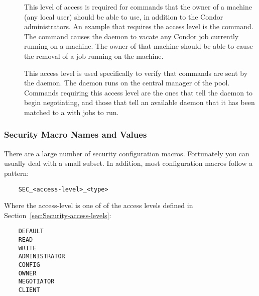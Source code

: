 \begin{description}

\item[] \label{sec-level-owner} This level of access is
   required for commands that the owner of a machine (any local user)
   should be able to use, in addition to the Condor administrators.
   An example that requires the  access level is
   the  command.
   The command causes the  daemon to vacate any
   Condor job currently running on a machine.
   The owner of that machine should be able to cause the removal
   of a job running on the machine.

\item[] \label{sec-level-negotiator} This 
   access level is used specifically to verify that commands are
   sent by the  daemon.
   The  daemon runs on the central manager of
   the pool.
   Commands requiring this access
   level are the ones that tell the  daemon to begin
   negotiating, and those that tell an available  daemon
   that it has been matched to a  with jobs to run.

\end{description}

\subsubsection{\label{sec:Security-NamesValues} Security Macro Names and Values}

There are a large number of security configuration macros. Fortunately
you can usually deal with a small subset. In addition, most
configuration macros follow a pattern:
\begin{verbatim}
    SEC_<access-level>_<type>
\end{verbatim}
Where the access-level is one of of the access levels defined in
Section~\ref{sec:Security-access-levels}: 
\begin{verbatim}
    DEFAULT
    READ
    WRITE
    ADMINISTRATOR
    CONFIG
    OWNER
    NEGOTIATOR
    CLIENT
\end{verbatim}

